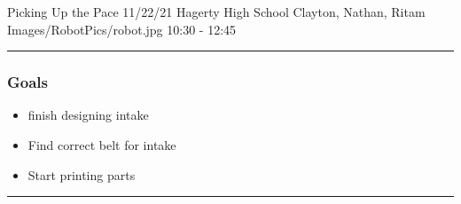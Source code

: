 \insertmeeting 
	{Picking Up the Pace} 
	{11/22/21}
	{Hagerty High School}
	{Clayton, Nathan, Ritam}
	{Images/RobotPics/robot.jpg}
	{10:30 - 12:45}
	
\noindent\hfil\rule{\textwidth}{.4pt}\hfil
\subsubsection*{Goals}
\begin{itemize}
    \item finish designing intake
    \item Find correct belt for intake
    \item Start printing parts

\end{itemize} 

\noindent\hfil\rule{\textwidth}{.4pt}\hfil

